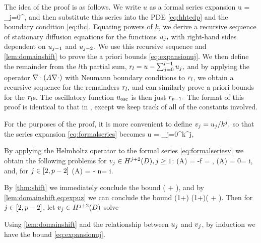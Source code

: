 The idea of the proof is as follows. We write $u$ as a formal series expansion
\beq\label{eq:formalseries}
u = \sum_{j=0}^\infty \usj,
\eeq
and then substitute this series into the PDE \cref{eq:hhtedp} and the boundary condition \eqref{eq:ibc}. Equating powers of $k$, we derive a recursive sequence of stationary diffusion equations for the functions $u_{j},$ with right-hand sides dependent on $u_{j-1}$ and $u_{j-2}$. We use this recursive sequence and \cref{lem:domainshift} to prove the a priori bounds \cref{eq:expansionuj}. We then define the remainder from the $l$th partial sum, $r_{l} = u - \sum_{j=0}^{l-1} u_{j},$ and by applying the operator $\grad\cdot\mleft(A\grad \cdot\mright)$ with Neumann boundary conditions to $r_{l}$, we obtain a recursive sequence for the remainders $r_{l},$ and can similarly prove a priori bounds for the $r_{l}$s. The oscillatory function $u_{\mathrm{osc}}$ is then just $r_{p-1}.$ The format of this proof is identical to that in \cite[Theorem 1]{ChNi:18a}, except we keep track of all of the constants involved.

For the purposes of the proof, it is more convenient to define $v_{j} = u_{j}/k^j,$ so that the series expansion \cref{eq:formalseries} becomes
\beq\label{eq:formalseriesv}
u = \sum_{j=0}^\infty k^j\vj,
\eeq

By applying the Helmholtz operator to the formal series \eqref{eq:formalseriesv} we obtain the following problems for $\vj \in \HjptD, j \geq 1$:
\beqs
\grad \cdot \mleft(A\grad \vz\mright) = -f \quad\tand\quad \dn \vz = \gI,
\eeqs
\beqs
\grad \cdot \mleft(A\grad \vo\mright) = 0\quad\tand\quad\dn \vo = i\vz,
\eeqs
and, for $j \in \mleft[2,p-2\mright]$
\beqs
\grad \cdot \mleft(A\grad \vj\mright) = - n\vjmt\quad\tand\quad\dn \vz = i\vjmo.
\eeqs

By \cref{thm:shift} we immediately conclude the bound
\beq\label{eq:expuz}
\NHtD{\vz} \leq \CAz\mleft( + \NHhGI{\gI}\mright),
\eeq
and by \cref{lem:domainshift,eq:expuz} we can conclude the bound
\beqs
\NHthD{\vo} \leq \CAo \mleft(1+\CTrt\mright) \leq \CAz \CAo \mleft(1+\CTrt\mright)\mleft( + \NHhGI{\gI}\mright).
\eeqs
Then for $j \in \mleft[2,p-2\mright]$, let $\vj \in \HjptD$ solve

Using \cref{lem:domainshift} and the relationship between $u_{j}$ and $v_{j}$, by induction we have the bound \cref{eq:expansionuj}.

